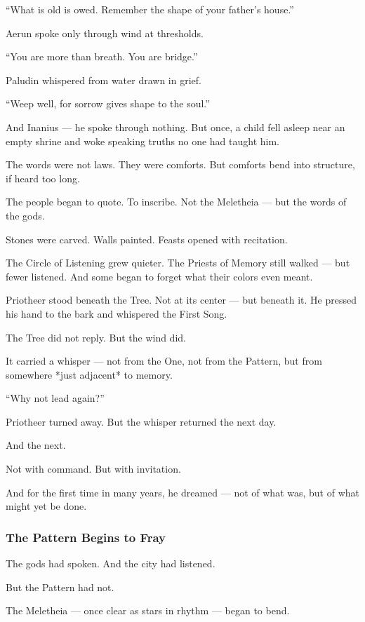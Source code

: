 \documentclass[12pt]{article}
\begin{document}
 “What is old is owed. Remember the shape of your father’s house.”

Aerun spoke only through wind at thresholds.  

 “You are more than breath. You are bridge.”

Paludin whispered from water drawn in grief.

 “Weep well, for sorrow gives shape to the soul.”

And Inanius —  
he spoke through nothing.  
But once, a child fell asleep near an empty shrine and woke speaking truths no one had taught him.

The words were not laws.  
They were comforts.  
But comforts bend into structure, if heard too long.

The people began to quote.  
To inscribe.  
Not the Meletheia — but the words of the gods.

Stones were carved.  
Walls painted.  
Feasts opened with recitation.

The Circle of Listening grew quieter.  
The Priests of Memory still walked —  
but fewer listened.  
And some began to forget what their colors even meant.

Priotheer stood beneath the Tree.  
Not at its center — but beneath it.  
He pressed his hand to the bark and whispered the First Song.

The Tree did not reply.  
But the wind did.

It carried a whisper — not from the One,  
not from the Pattern,  
but from somewhere *just adjacent* to memory.

 “Why not lead again?”

Priotheer turned away.  
But the whisper returned the next day.

And the next.

Not with command.  
But with invitation.

And for the first time in many years,  
he dreamed —  
not of what was,  
but of what might yet be done.

\dotfill

\subsubsection*{The Pattern Begins to Fray}

The gods had spoken.  
And the city had listened.

But the Pattern had not.

The Meletheia — once clear as stars in rhythm — began to bend. 
\end{document}
